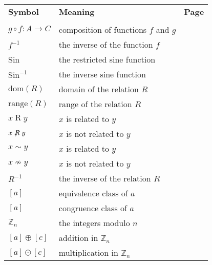 \begin{tabular}{p{1in} p{2.5in} l}
\textbf{Symbol}              &  \textbf{Meaning}  &  \textbf{Page} \\
        &           &       \\ 
$g \circ f:A \to C$  &  composition of functions $f$ and $g$  &  \pageref{sym:composition}  \\
$f^{ - 1} $          &  the inverse of the function $f$       &  \pageref{sym:finverse}  \\
Sin                  &  the restricted sine function         &  \pageref{sym:restrictsine}  \\
$\text{Sin}^{ - 1}$  &  the inverse sine function            &  \pageref{sym:inversesine}  \\
$\text{dom} ( R )$  &  domain of the relation $R$  &  \pageref{sym:domrel}  \\
$\text{range} ( R )$ & range of the relation $R$   &  \pageref{sym:domrel}  \\
$x \mathrel{R} y$   &  $x$ is related to $y$                  &  \pageref{sym:xrelatedy}  \\
$x \mathrel{\not \negthickspace R} y$  &  $x$ is not related to $y$ & \pageref{sym:xrelatedy}  \\
$x \sim y$   &  $x$ is related to $y$                  &  \pageref{sym:xtwiddley}  \\
$x \nsim y$  &  $x$ is not related to $y$              & \pageref{sym:xtwiddley}  \\
$R^{-1}$     &  the inverse of the relation $R$        &  \pageref{sym:Rinverse}  \\
$\left[ a \right]$  &  equivalence class of $a$        &  \pageref{sym:equivclass}  \\
$\left[ a \right]$  &  congruence class of $a$        &  \pageref{sym:conclass}  \\
$\mathbb{Z}_{n} $   &  the integers modulo $n$        &  \pageref{sym:integersmodn}  \\
$\left[ a \right] \oplus \left[ c \right]$ &  addition in $\mathbb{Z}_n$  &  \pageref{sym:addmodn}  \\
$\left[ a \right] \odot \left[ c \right]$ &  multiplication in $\mathbb{Z}_n$  &  
\pageref{sym:addmodn}  \\
%
%

\end{tabular}
